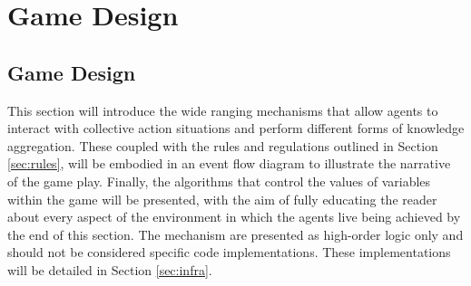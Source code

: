 \chapter{Game Design}\label{game design}






\section{Game Design}\label{sec: game design}

This section will introduce the wide ranging mechanisms that allow agents to interact with collective action situations and perform different forms of knowledge aggregation. These coupled with the rules and regulations outlined in Section \ref{sec:rules}, will be embodied in an event flow diagram to illustrate the narrative of the game play. Finally, the algorithms that control the values of variables within the game will be presented, with the aim of fully educating the reader about every aspect of the environment in which the agents live being achieved by the end of this section. The mechanism are presented as high-order logic only and should not be considered specific code implementations. These implementations will be detailed in Section \ref{sec:infra}.


